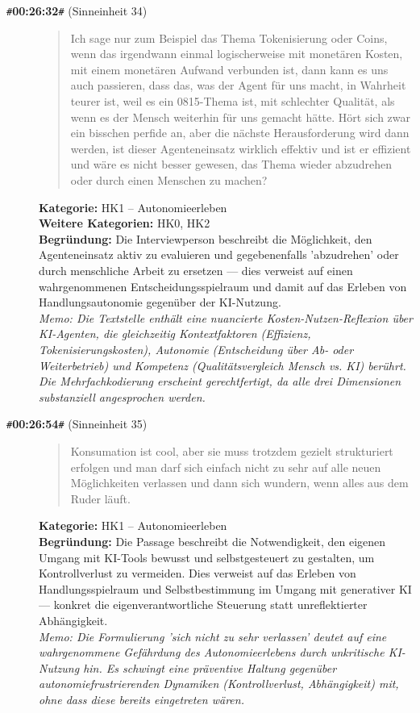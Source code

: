 \begin{description}
  \item[\texttt{\#}\textbf{00:26:32}\texttt{\#} (Sinneinheit 34)]
  \begin{quote}
  Ich sage nur zum Beispiel das Thema Tokenisierung oder Coins, wenn das irgendwann einmal logischerweise mit monetären Kosten, mit einem monetären Aufwand verbunden ist, dann kann es uns auch passieren, dass das, was der Agent für uns macht, in Wahrheit teurer ist, weil es ein 0815-Thema ist, mit schlechter Qualität, als wenn es der Mensch weiterhin für uns gemacht hätte. Hört sich zwar ein bisschen perfide an, aber die nächste Herausforderung wird dann werden, ist dieser Agenteneinsatz wirklich effektiv und ist er effizient und wäre es nicht besser gewesen, das Thema wieder abzudrehen oder durch einen Menschen zu machen?
  \end{quote}
  \textbf{Kategorie:} HK1 -- Autonomieerleben\\
  \textbf{Weitere Kategorien:} HK0, HK2\\
  \textbf{Begr\"undung:} Die Interviewperson beschreibt die Möglichkeit, den Agenteneinsatz aktiv zu evaluieren und gegebenenfalls 'abzudrehen' oder durch menschliche Arbeit zu ersetzen — dies verweist auf einen wahrgenommenen Entscheidungsspielraum und damit auf das Erleben von Handlungsautonomie gegenüber der KI-Nutzung.
  \\\textit{Memo: Die Textstelle enthält eine nuancierte Kosten-Nutzen-Reflexion über KI-Agenten, die gleichzeitig Kontextfaktoren (Effizienz, Tokenisierungskosten), Autonomie (Entscheidung über Ab- oder Weiterbetrieb) und Kompetenz (Qualitätsvergleich Mensch vs. KI) berührt. Die Mehrfachkodierung erscheint gerechtfertigt, da alle drei Dimensionen substanziell angesprochen werden.}
\end{description}
\medskip

\begin{description}
  \item[\texttt{\#}\textbf{00:26:54}\texttt{\#} (Sinneinheit 35)]
  \begin{quote}
  Konsumation ist cool, aber sie muss trotzdem gezielt strukturiert erfolgen und man darf sich einfach nicht zu sehr auf alle neuen Möglichkeiten verlassen und dann sich wundern, wenn alles aus dem Ruder läuft.
  \end{quote}
  \textbf{Kategorie:} HK1 -- Autonomieerleben\\
  \textbf{Begr\"undung:} Die Passage beschreibt die Notwendigkeit, den eigenen Umgang mit KI-Tools bewusst und selbstgesteuert zu gestalten, um Kontrollverlust zu vermeiden. Dies verweist auf das Erleben von Handlungsspielraum und Selbstbestimmung im Umgang mit generativer KI — konkret die eigenverantwortliche Steuerung statt unreflektierter Abhängigkeit.
  \\\textit{Memo: Die Formulierung 'sich nicht zu sehr verlassen' deutet auf eine wahrgenommene Gefährdung des Autonomieerlebens durch unkritische KI-Nutzung hin. Es schwingt eine präventive Haltung gegenüber autonomiefrustrierenden Dynamiken (Kontrollverlust, Abhängigkeit) mit, ohne dass diese bereits eingetreten wären.}
\end{description}
\medskip

